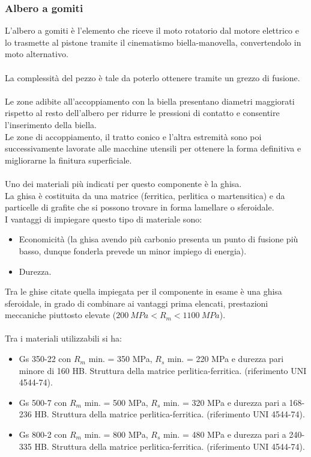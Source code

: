 \subsubsection{Albero a gomiti}
L’albero a gomiti è l’elemento che riceve il moto rotatorio dal motore elettrico e lo trasmette al pistone tramite il cinematismo biella-manovella, convertendolo in moto alternativo. \\
\\
La complessità del pezzo è tale da poterlo ottenere tramite un grezzo di fusione. \\
\\
Le zone adibite all’accoppiamento con la biella presentano diametri maggiorati rispetto al resto dell’albero per ridurre le pressioni di contatto e consentire l’inserimento della biella. \\
Le zone di accoppiamento, il tratto conico e l’altra estremità sono poi successivamente lavorate alle macchine utensili per ottenere la forma definitiva e migliorarne la finitura superficiale. \\
\\
Uno dei materiali più indicati per questo componente è la ghisa. \\
La ghisa è costituita da una matrice (ferritica, perlitica o martensitica) e da particelle di grafite che si possono trovare in forma lamellare o sferoidale. \\
I vantaggi di impiegare questo tipo di materiale sono: 
\begin{itemize}
    \item Economicità (la ghisa avendo più carbonio presenta un punto di fusione più basso, dunque fonderla prevede un minor impiego di energia).
    \item Durezza.
\end{itemize}
Tra le ghise citate quella impiegata per il componente in esame è una ghisa sferoidale, in grado di combinare ai vantaggi prima elencati, prestazioni meccaniche piuttosto elevate ($200\ MPa<R_m<1100\ MPa$).\\
\\
Tra i materiali utilizzabili si ha: 
\begin{itemize}
    \item Gs 350-22 con $R_m$ min. = 350 MPa, $R_s$ min. = 220 MPa e durezza pari minore di 160 HB. Struttura della matrice perlitica-ferritica. (riferimento UNI 4544-74).
    \item Gs 500-7 con $R_m$ min. = 500 MPa, $R_s$ min. = 320 MPa e durezza pari a  168-236 HB. Struttura della matrice perlitica-ferritica. (riferimento UNI 4544-74).
    \item Gs 800-2 con $R_m$ min. = 800 MPa, $R_s$ min. = 480 MPa e durezza pari a  240-335 HB. Struttura della matrice perlitica-ferritica. (riferimento UNI 4544-74).
\end{itemize}
